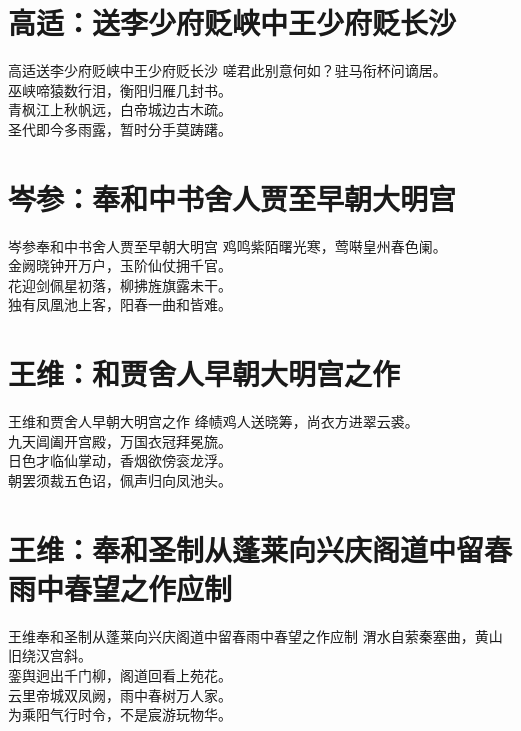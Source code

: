 \documentclass[12pt,oneside,a5paper]{book}
\begin{document}
\chapter{高适：送李少府贬峡中王少府贬长沙}
\begin{poemzh}{高适}{送李少府贬峡中王少府贬长沙}
嗟君此别意何如？驻马衔杯问谪居。\\
巫峡啼猿数行泪，衡阳归雁几封书。\\
青枫江上秋帆远，白帝城边古木疏。\\
圣代即今多雨露，暂时分手莫踌躇。\\ 
\end{poemzh}

\chapter{岑参：奉和中书舍人贾至早朝大明宫}
\begin{poemzh}{岑参}{奉和中书舍人贾至早朝大明宫}
鸡鸣紫陌曙光寒，莺啭皇州春色阑。\\
金阙晓钟开万户，玉阶仙仗拥千官。\\
花迎剑佩星初落，柳拂旌旗露未干。\\
独有凤凰池上客，阳春一曲和皆难。\\ 
\end{poemzh}

\chapter{王维：和贾舍人早朝大明宫之作}
\begin{poemzh}{王维}{和贾舍人早朝大明宫之作}
绛帻鸡人送晓筹，尚衣方进翠云裘。\\
九天阊阖开宫殿，万国衣冠拜冕旒。\\
日色才临仙掌动，香烟欲傍衮龙浮。\\
朝罢须裁五色诏，佩声归向凤池头。\\ 
\end{poemzh}

\chapter{王维：奉和圣制从蓬莱向兴庆阁道中留春雨中春望之作应制}
\begin{poemzh}{王维}{奉和圣制从蓬莱向兴庆阁道中留春雨中春望之作应制}
渭水自萦秦塞曲，黄山旧绕汉宫斜。\\
銮舆迥出千门柳，阁道回看上苑花。\\
云里帝城双凤阙，雨中春树万人家。\\
为乘阳气行时令，不是宸游玩物华。\\ 
\end{poemzh}
\end{document}
